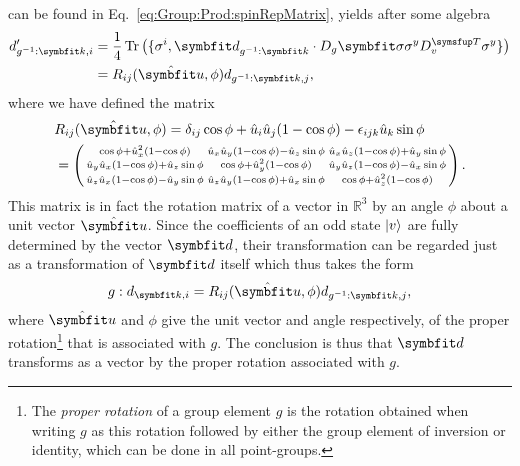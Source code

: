 can be found in  Eq.~\eqref{eq:Group:Prod:spinRepMatrix}, yields after some algebra
\begin{equation}
    \label{eq:Group:pdRep:transformedD}
    \begin{split}
        d'_{g^{-1}:\v{k},i} &= \frac{1}{4}\tr\big(\{\sigma^i, \v{d}_{g^{-1}:\v{k}}\cdot D_g\v{\sigma}\sigma^yD_v^\trans\sigma^y\}\big)\\
        &= R_{ij}(\hat{\v{u}},\phi)d_{g^{-1}:\v{k},j},
    \end{split}
\end{equation}
where we have defined the matrix
\begin{equation}
    \label{eq:Group:pdRep:rotMatrixIndices}
    \begin{split}
        &R_{ij}(\hat{\v{u}},\phi) = \delta_{ij}\cos\phi + \hat{u}_i\hat{u}_j(1-\cos\phi)-\epsilon_{ijk}\hat{u}_k\sin\phi\\
        & = 
        \left(\begin{smallmatrix}
            \cos\phi + \hat{u}_x^2(1-\cos\phi) & \hat{u}_x\hat{u}_y(1-\cos\phi)-\hat{u}_z\sin\phi & \hat{u}_x\hat{u}_z(1-\cos\phi)+\hat{u}_y\sin\phi\\
            \hat{u}_y\hat{u}_x(1-\cos\phi)+\hat{u}_z\sin\phi & \cos\phi+\hat{u}_y^2(1-\cos\phi) & \hat{u}_y\hat{u}_z(1-\cos\phi)-\hat{u}_x\sin\phi\\
            \hat{u}_z\hat{u}_x(1-\cos\phi)-\hat{u}_y\sin\phi & \hat{u}_z\hat{u}_y(1-\cos\phi)+\hat{u}_x\sin\phi & \cos\phi+\hat{u}_z^2(1-\cos\phi)
        \end{smallmatrix}\right).
    \end{split}
\end{equation}
This matrix is in fact the rotation matrix of a vector in $\mathbb{R}^3$ by an angle $\phi$ about a unit vector $\hat{\v{u}}$. Since the coefficients
 of an odd state $\lvert v \rangle$ are fully determined by the vector $\v{d}$, their transformation can be regarded just as a transformation of $\v{d}$ itself
 which thus takes the form
\begin{equation}
    \label{eq:Group:pdRep:dTransformation}
    g:d_{\v{k},i} = R_{ij}(\hat{\v{u}},\phi)d_{g^{-1}:\v{k},j},
\end{equation}
where $\hat{\v{u}}$ and $\phi$ give the unit vector and angle respectively, of the proper rotation\footnote{The \emph{proper rotation} of a group element $g$ is
the rotation obtained when writing $g$ as this rotation followed by either the group element of inversion or identity, which can be done in all point-groups.} that
is associated with $g$. The conclusion is thus that
$\v{d}$ transforms as a vector by the proper rotation associated with $g$.


